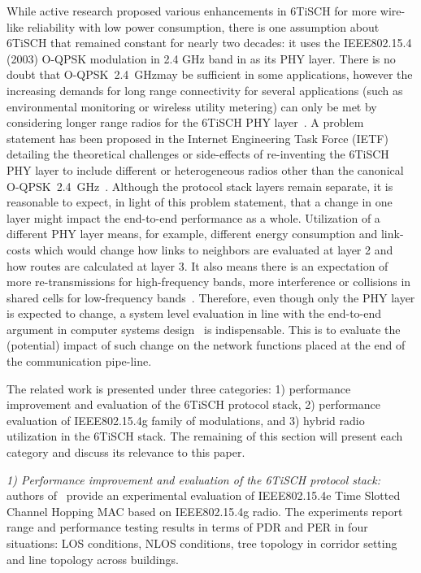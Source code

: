 \documentclass[journal,article,submit,moreauthors,pdftex]{Definitions/mdpi}
\newcommand{\oqpsk}        {O-QPSK~2.4~GHz}
\begin{document}
While active research proposed various enhancements in 6TiSCH  for more wire-like reliability with low power consumption, there is one assumption about 6TiSCH that remained constant for nearly two decades: it uses the IEEE802.15.4 (2003) O-QPSK modulation in 2.4 GHz band in as its PHY layer. 
There is no doubt that \oqpsk may be sufficient in some applications, however the increasing demands for long range connectivity for several applications (such as environmental monitoring or wireless utility metering) can only be met by considering longer range radios for the 6TiSCH PHY layer~\cite{munoz18evaluationa}.
A problem statement has been proposed in the Internet Engineering Task Force (IETF) detailing the theoretical challenges or side-effects of re-inventing the 6TiSCH PHY layer to include different or heterogeneous radios other than the canonical \oqpsk~\cite{draft-munoz-6tisch-multi-phy-nodes}. 
Although the protocol stack layers remain separate, it is reasonable to expect, in light of this problem statement, that a change in one layer might impact the end-to-end performance as a whole. 
Utilization of a different PHY layer means, for example, different energy consumption and link-costs which would change how links to neighbors are evaluated at layer 2 and how routes are calculated at layer 3.
It also means there is an expectation of more re-transmissions for high-frequency bands, more interference or collisions in shared cells for low-frequency bands~\cite{kim15hybrid}.
Therefore, even though only the PHY layer is expected to change, a system level evaluation in line with the end-to-end argument in computer systems design~\cite{saltzer84endtoend} is indispensable.
This is to evaluate the (potential) impact of such change on the network functions placed at the end of the communication pipe-line. 


The related work is presented under three categories: 
    1) performance improvement and evaluation of the 6TiSCH protocol stack,
    2) performance evaluation of IEEE802.15.4g family of modulations, and
    3) hybrid radio utilization in the 6TiSCH stack. 
The remaining of this section will present each category and discuss its relevance to this paper.


\textit{1) Performance improvement and evaluation of the 6TiSCH protocol stack:} authors of~\cite{sum17experimental} provide an experimental evaluation of IEEE802.15.4e Time Slotted Channel Hopping MAC based on IEEE802.15.4g radio.
The experiments report range and performance testing results in terms of PDR and PER in four situations: LOS conditions, NLOS conditions, tree topology in corridor setting and line topology across buildings.
\end{document}

